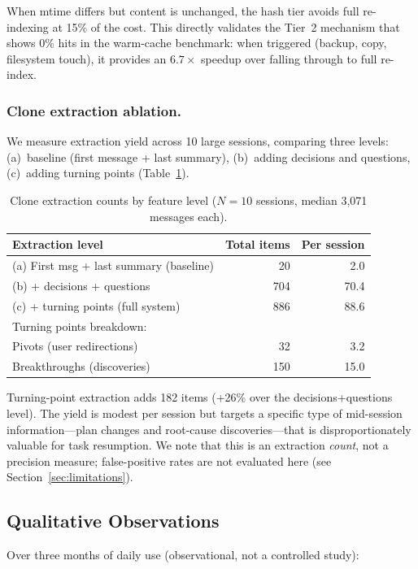 \documentclass[11pt]{article}
\begin{document}
When mtime differs but content is unchanged, the hash tier avoids full re-indexing at 15\% of the cost. This directly validates the Tier~2 mechanism that shows 0\% hits in the warm-cache benchmark: when triggered (backup, copy, filesystem touch), it provides an $6.7\times$ speedup over falling through to full re-index.

\subsubsection{Clone extraction ablation.} We measure extraction yield across 10 large sessions, comparing three levels: (a)~baseline (first message + last summary), (b)~adding decisions and questions, (c)~adding turning points (Table~\ref{tab:clone_ablation}).

\begin{table}[ht]
\centering
\caption{Clone extraction counts by feature level ($N = 10$ sessions, median 3,071 messages each).}
\label{tab:clone_ablation}
\begin{tabular}{lrr}
\toprule
Extraction level & Total items & Per session \\
\midrule
(a) First msg + last summary (baseline) & 20 & 2.0 \\
(b) + decisions + questions & 704 & 70.4 \\
(c) + turning points (full system) & 886 & 88.6 \\
\midrule
Turning points breakdown: & & \\
\quad Pivots (user redirections) & 32 & 3.2 \\
\quad Breakthroughs (discoveries) & 150 & 15.0 \\
\bottomrule
\end{tabular}
\end{table}

Turning-point extraction adds 182 items (+26\% over the decisions+questions level). The yield is modest per session but targets a specific type of mid-session information---plan changes and root-cause discoveries---that is disproportionately valuable for task resumption. We note that this is an extraction \emph{count}, not a precision measure; false-positive rates are not evaluated here (see Section~\ref{sec:limitations}).

\subsection{Qualitative Observations}

Over three months of daily use (observational, not a controlled study):
\end{document}

